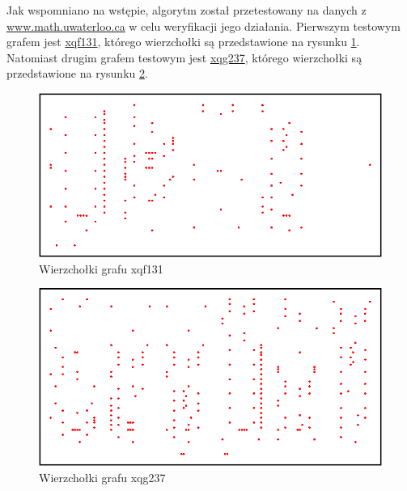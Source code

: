 \documentclass[11pt]{article}
\begin{document}
Jak wspomniano na wstępie, algorytm został przetestowany na danych z
{\color{blue} \href{https://www.math.uwaterloo.ca/tsp/vlsi/index.html}
{www.math.uwaterloo.ca}} w celu weryfikacji jego działania. Pierwszym testowym
grafem jest
{\color{blue} \href{https://www.math.uwaterloo.ca/tsp/vlsi/xqf131.points.html}
{xqf131}}, którego wierzchołki są przedstawione na rysunku \cref{fig:xqf131}.
Natomiast drugim grafem testowym jest
{\color{blue} \href{https://www.math.uwaterloo.ca/tsp/vlsi/xqg237.points.html}
{xqg237}}, którego wierzchołki są przedstawione na rysunku \cref{fig:xqg237}.
\begin{figure}
    \centering
    \includegraphics[scale=0.7]{img/xqf131.png}
    \caption{Wierzchołki grafu xqf131}
    \label{fig:xqf131}
\end{figure}
\begin{figure}
    \centering
    \includegraphics[scale=0.7]{img/xqg237.png}
    \caption{Wierzchołki grafu xqg237}
    \label{fig:xqg237}
\end{figure}
\end{document}
